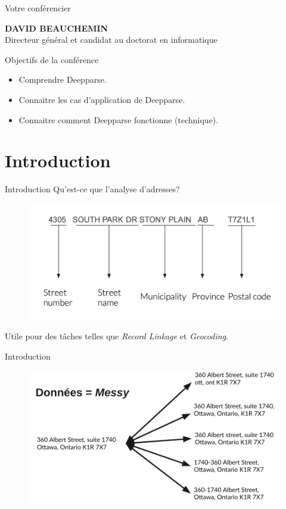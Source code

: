 \documentclass{beamer}
\begin{document}
\begin{frame}{Votre conférencier}
		\begin{minipage}{0.25\linewidth}
			\tiny\textbf{DAVID BEAUCHEMIN} \\
			Directeur général et candidat au doctorat en informatique
		\end{minipage}
	\end{frame}
	
	\begin{frame}{Objectifs de la conférence}
		\begin{itemize}
			\item Comprendre Deepparse.
			\item Connaitre les cas d'application de Deepparse.
			\item Connaitre comment Deepparse fonctionne (technique).
		\end{itemize}
	\end{frame}
	
	\section{Introduction}
	
	\begin{frame}{Introduction}
		Qu'est-ce que l'analyse d'adresses?
		\begin{figure}
			\centering
			\includegraphics[width=\linewidth]{address_parsing_example.png}
		\end{figure}
		
		Utile pour des tâches telles que \textit{Record Linkage} et \textit{Geocoding}.
	\end{frame}
	
	\begin{frame}{Introduction}
		\begin{figure}
			\centering
			\includegraphics[width=0.7\linewidth]{img/messy}
		\end{figure}
	\end{frame}
	
\end{document}
